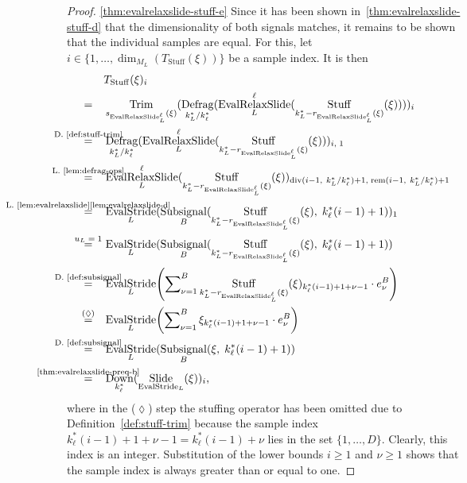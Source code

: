 \documentclass[journal]{IEEEtran}
\newcommand{\ROI}{B}
\newcommand{\discint}[2]{\{#1,\dotsc,#2\}}
\newcommand{\inint}[2]{\in\discint{#1}{#2}}
\DeclareMathOperator{\Subsignal}{Subsignal}
\DeclareMathOperator{\Slide}{Slide}
\DeclareMathOperator{\Defragmentation}{Defrag}
\DeclareMathOperator{\EvalStride}{EvalStride}
\DeclareMathOperator{\Stuffing}{Stuff}
\DeclareMathOperator{\Trimming}{Trim}
\renewcommand{\div}[2]{\operatorname{div}(#1,\ #2)}
\newcommand{\rem}[2]{\operatorname{rem}(#1,\ #2)}
\newcommand{\equsing}[1]{\overset{\mathclap{\text{#1}}}{=}}
\DeclareMathOperator{\EvalRelaxSlide}{EvalRelaxSlide}
\DeclareMathOperator{\Downsampling}{Down}
\begin{document}
\begin{proof}
\ref{thm:evalrelaxslide-stuff-e}
Since it has been shown in~\ref{thm:evalrelaxslide-stuff-d} that the dimensionality of both signals matches, it remains to be shown that the individual samples are equal.
For this, let $i\inint{1}{\dim_{M_L}( T_{\Stuffing}(\xi) )}$ be a sample index.
It is then
\begin{align*}
  & T_{\Stuffing}(\xi)_i\\
  =\ \ \ & \Trimming_{s_{\EvalRelaxSlide_L^\ell}(\xi)}( \Defragmentation_{k_L^* / k_\ell^*}( \EvalRelaxSlide_L^\ell( \Stuffing_{k_L^* - r_{\EvalRelaxSlide_L^\ell}(\xi)}(\xi) ) ) )_i\\
  \equsing{D.~\ref{def:stuff-trim}}\ \ \ & \Defragmentation_{k_L^* / k_\ell^*}( \EvalRelaxSlide_L^\ell( \Stuffing_{k_L^* - r_{\EvalRelaxSlide_L^\ell}(\xi)}(\xi) ) )_{i,\;1}\\
  \equsing{L.~\ref{lem:defrag-ops}}\ \ \ & \EvalRelaxSlide_L^\ell( \Stuffing_{k_L^* - r_{\EvalRelaxSlide_L^\ell}(\xi)}(\xi) )_{\div{i - 1}{k_L^* / k_\ell^*} + 1,\;\rem{i - 1}{k_L^* / k_\ell^*} + 1}\\
  \equsing{L.~\ref{lem:evalrelaxslide}\ref{lem:evalrelaxslide-d}}\ \ \ & \EvalStride_L(\Subsignal_\ROI(\Stuffing_{k_L^* - r_{\EvalRelaxSlide_L^\ell}(\xi)}(\xi),\; k_\ell^*(i - 1) + 1))_1\\
  \equsing{$u_L = 1$}\ \ \ & \EvalStride_L(\Subsignal_\ROI(\Stuffing_{k_L^* - r_{\EvalRelaxSlide_L^\ell}(\xi)}(\xi),\; k_\ell^*(i - 1) + 1))\\
  \equsing{D.~\ref{def:subsignal}}\ \ \ & \EvalStride_L\!\left(\sum\nolimits_{\nu = 1}^\ROI \Stuffing_{k_L^* - r_{\EvalRelaxSlide_L^\ell}(\xi)}(\xi)_{k_\ell^*(i - 1) + 1 + \nu - 1}\cdot e_\nu^\ROI\right)\\
  \equsing{($\lozenge$)}\ \ \ & \EvalStride_L\!\left(\sum\nolimits_{\nu = 1}^\ROI \xi_{k_\ell^*(i - 1) + 1 + \nu - 1}\cdot e_\nu^\ROI\right)\\
  \equsing{D.~\ref{def:subsignal}}\ \ \ & \EvalStride_L(\Subsignal_\ROI(\xi,\; k_\ell^*(i - 1) + 1))\\
  \equsing{\ref{thm:evalrelaxslide-preq-b}}\ \ \ & \Downsampling_{k_\ell^*}( \Slide_{\EvalStride_L}(\xi) )_i\text{,}
\end{align*}
where in the ($\lozenge$) step the stuffing operator has been omitted due to Definition~\ref{def:stuff-trim} because the sample index $k_\ell^*(i - 1) + 1 + \nu - 1 = k_\ell^*(i - 1) + \nu$ lies in the set $\discint{1}{D}$.
Clearly, this index is an integer.
Substitution of the lower bounds $i \geq 1$ and $\nu \geq 1$ shows that the sample index is always greater than or equal to one.

\end{proof}
\end{document}
